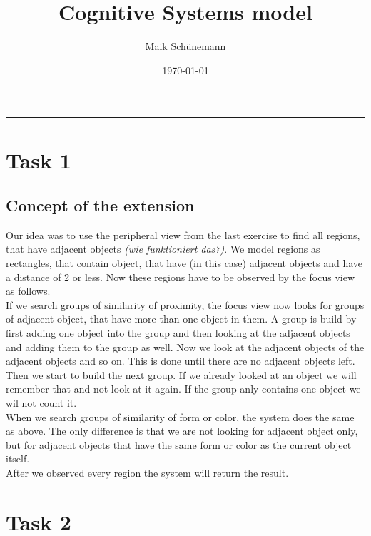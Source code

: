 \documentclass[11pt,a4paper,oneside]{scrartcl}
\author{Maik Schünemann}
\date{\today}
\title{Cognitive Systems model}
\begin{document}
\maketitle
\tableofcontents


\rule{\linewidth}{0.5pt}

\section{Task 1}
\subsection{Concept of the extension}
Our idea was to use the peripheral view from the last exercise to find all regions, that have adjacent objects \textit{(wie funktioniert das?)}. We model regions as rectangles, that contain object, that have (in this case) adjacent objects and have a distance of 2 or less. Now these regions have to be observed by the focus view as follows.\\
If we search groups of similarity of proximity, the focus view now looks for groups of adjacent object, that have more than one object in them. A group is build by first adding one object into the group and then looking at the adjacent objects and adding them to the group as well. Now we look at the adjacent objects of the adjacent objects and so on. This is done until there are no adjacent objects left. Then we start to build the next group. If we already looked at an object we will remember that and not look at it again. If the group anly contains one object we wil not count it.\\
When we search groups of similarity of form or color, the system does the same as above. The only difference is that we are not looking for adjacent object only, but for adjacent objects that have the same form or color as the current object itself.\\
After we observed every region the system will return the result.
\section{Task 2}
\end{document}
